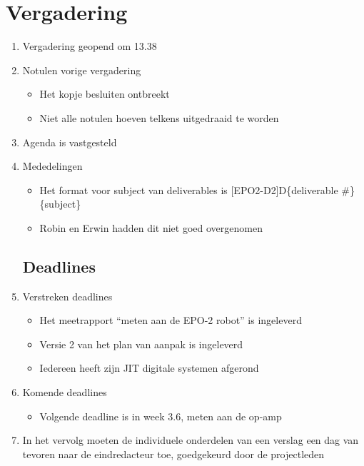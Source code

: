 \documentclass{article}
\begin{document}
\section*{Vergadering}
\begin{enumerate}
	
	\subsection*{Vooraf}
	\item Vergadering geopend om 13.38
	\item Notulen vorige vergadering
	\begin{itemize}
		\item Het kopje besluiten ontbreekt
		\item Niet alle notulen hoeven telkens uitgedraaid te worden
	\end{itemize}
	\item Agenda is vastgesteld
	\item Mededelingen
	\begin{itemize}
		\item Het format voor subject van deliverables is [EPO2-D2]D\{deliverable \#\} \{subject\}
		\item Robin en Erwin hadden dit niet goed overgenomen
	\end{itemize}

	\subsection*{Deadlines}
	\item Verstreken deadlines
	\begin{itemize}
		\item Het meetrapport ``meten aan de EPO-2 robot'' is ingeleverd
		\item Versie 2 van het plan van aanpak is ingeleverd
		\item Iedereen heeft zijn JIT digitale systemen afgerond
	\end{itemize}
	\item Komende deadlines
	\begin{itemize}
		\item Volgende deadline is in week 3.6, meten aan de op-amp
	\end{itemize}
	\item In het vervolg moeten de individuele onderdelen van een verslag een dag van tevoren naar de eindredacteur toe, goedgekeurd door de projectleden


\end{enumerate}
\end{document}
